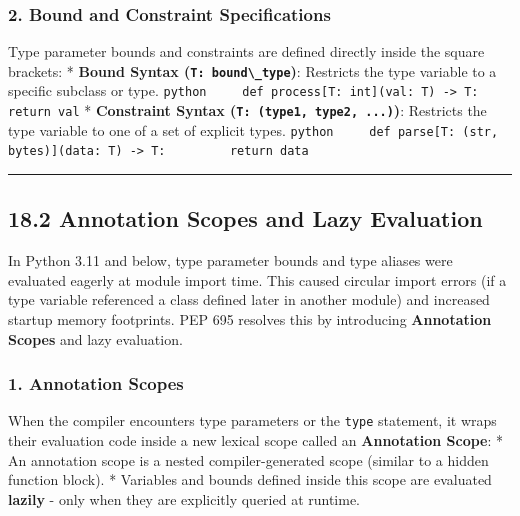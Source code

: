 \hypertarget{bound-and-constraint-specifications}{%
\subsubsection{2. Bound and Constraint
Specifications}\label{bound-and-constraint-specifications}}

Type parameter bounds and constraints are defined directly inside the
square brackets: * \textbf{Bound Syntax
(\passthrough{\lstinline!T: bound\_type!})}: Restricts the type variable
to a specific subclass or type.
\passthrough{\lstinline!python     def process[T: int](val: T) -> T:         return val!}
* \textbf{Constraint Syntax
(\passthrough{\lstinline!T: (type1, type2, ...)!})}: Restricts the type
variable to one of a set of explicit types.
\passthrough{\lstinline!python     def parse[T: (str, bytes)](data: T) -> T:         return data!}

\begin{center}\rule{0.5\linewidth}{0.5pt}\end{center}

\hypertarget{annotation-scopes-and-lazy-evaluation}{%
\subsection{18.2 Annotation Scopes and Lazy
Evaluation}\label{annotation-scopes-and-lazy-evaluation}}

In Python 3.11 and below, type parameter bounds and type aliases were
evaluated eagerly at module import time. This caused circular import
errors (if a type variable referenced a class defined later in another
module) and increased startup memory footprints. PEP 695 resolves this
by introducing \textbf{Annotation Scopes} and lazy evaluation.

\hypertarget{annotation-scopes}{%
\subsubsection{1. Annotation Scopes}\label{annotation-scopes}}

When the compiler encounters type parameters or the
\passthrough{\lstinline!type!} statement, it wraps their evaluation code
inside a new lexical scope called an \textbf{Annotation Scope}: * An
annotation scope is a nested compiler-generated scope (similar to a
hidden function block). * Variables and bounds defined inside this scope
are evaluated \textbf{lazily} - only when they are explicitly queried at
runtime.

